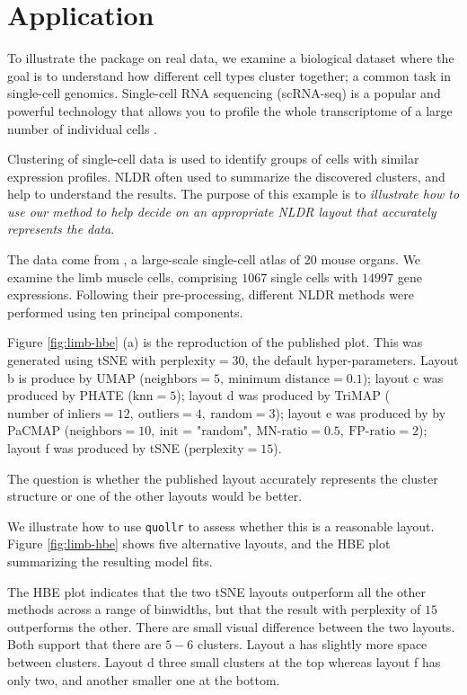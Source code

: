 \section{Application}\label{application}

To illustrate the package on real data, we examine a biological dataset where the goal is to understand how different cell types cluster together; a common task in single-cell genomics. Single-cell RNA sequencing (scRNA-seq) is a popular and powerful technology that allows you to profile the whole transcriptome of a large number of individual cells \citep{andrews2021}.

Clustering of single-cell data is used to identify groups of cells with similar expression profiles. NLDR often used to summarize the discovered clusters, and help to understand the results. The purpose of this example is to \emph{illustrate how to use our method to help decide on an appropriate NLDR layout that accurately represents the data}.

The data come from \citet{tabula2018}, a large-scale single-cell atlas of 20 mouse organs. We examine the limb muscle cells, comprising \(1067\) single cells with \(14997\) gene expressions. Following their pre-processing, different NLDR methods were performed using ten principal components.

Figure \ref{fig:limb-hbe} (a) is the reproduction of the published plot. This was generated using tSNE with \(\text{perplexity}=30\), the default hyper-parameters. Layout b is produce by UMAP (\(\text{neighbors}=5, ~\text{minimum distance}=0.1\)); layout c was produced by PHATE (\(\text{knn}=5\)); layout d was produced by TriMAP (\(\text{number of inliers}=12,~\text{outliers}=4,~\text{random}=3\)); layout e was produced by by PaCMAP (\(\text{neighbors}=10,~\text{init = "random"}, ~\text{MN-ratio}=0.5,~\text{FP-ratio}=2\)); layout f was produced by tSNE (\(\text{perplexity}=15\)).

The question is whether the published layout accurately represents the cluster structure or one of the other layouts would be better.

We illustrate how to use \texttt{quollr} to assess whether this is a reasonable layout. Figure \ref{fig:limb-hbe} shows five alternative layouts, and the HBE plot summarizing the resulting model fits.

The HBE plot indicates that the two tSNE layouts outperform all the other methods across a range of binwidths, but that the result with perplexity of \(15\) outperforms the other. There are small visual difference between the two layouts. Both support that there are \(5-6\) clusters. Layout a has slightly more space between clusters. Layout d three small clusters at the top whereas layout f has only two, and another smaller one at the bottom.

